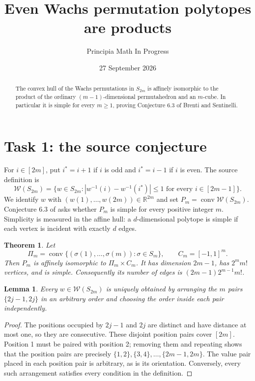 \documentclass[11pt]{article}
\title{Even Wachs permutation polytopes are products}
\author{Principia Math In Progress}
\date{27 September 2026}
\newtheorem{theorem}{Theorem}
\newtheorem{lemma}{Lemma}
\newcommand{\conv}{\operatorname{conv}}
\newcommand{\W}{\mathcal W}
\begin{document}
\maketitle
\begin{abstract}
The convex hull of the Wachs permutations in $S_{2m}$ is affinely
isomorphic to the product of the ordinary $(m-1)$-dimensional
permutahedron and an $m$-cube. In particular it is simple for every
$m\geq1$, proving Conjecture 6.3 of Brenti and Sentinelli.
\end{abstract}

\section*{Task 1: the source conjecture}
For $i\in[2m]$, put $i^*=i+1$ if $i$ is odd and $i^*=i-1$ if $i$ is even.
The source definition is
\[
 \W(S_{2m})=\{w\in S_{2m}:
 |w^{-1}(i)-w^{-1}(i^*)|\leq1\text{ for every }i\in[2m-1]\}.
\]
We identify $w$ with $(w(1),\ldots,w(2m))\in\mathbb R^{2m}$ and set
$P_m=\conv\W(S_{2m})$. Conjecture 6.3 of \cite{BS} asks whether
$P_m$ is simple for every positive integer $m$. Simplicity is measured
in the affine hull: a $d$-dimensional polytope is simple if each vertex
is incident with exactly $d$ edges.

\begin{theorem}\label{main}
Let
\[
 \Pi_m=\conv\{(\sigma(1),\ldots,\sigma(m)):\sigma\in S_m\},
 \qquad C_m=[-1,1]^m.
\]
Then $P_m$ is affinely isomorphic to $\Pi_m\times C_m$. It has dimension
$2m-1$, has $2^m m!$ vertices, and is simple. Consequently its number
of edges is $(2m-1)2^{m-1}m!$.
\end{theorem}

\begin{lemma}\label{blocks}
Every $w\in\W(S_{2m})$ is uniquely obtained by arranging the $m$ pairs
$\{2j-1,2j\}$ in an arbitrary order and choosing the order inside each
pair independently.
\end{lemma}
\begin{proof}
The positions occupied by $2j-1$ and $2j$ are distinct and have distance
at most one, so they are consecutive. These disjoint position pairs cover
$[2m]$. Position 1 must be paired with position 2; removing them and
repeating shows that the position pairs are precisely
$\{1,2\},\{3,4\},\ldots,\{2m-1,2m\}$. The value pair placed in each
position pair is arbitrary, as is its orientation. Conversely, every such
arrangement satisfies every condition in the definition.
\end{proof}
\end{document}
